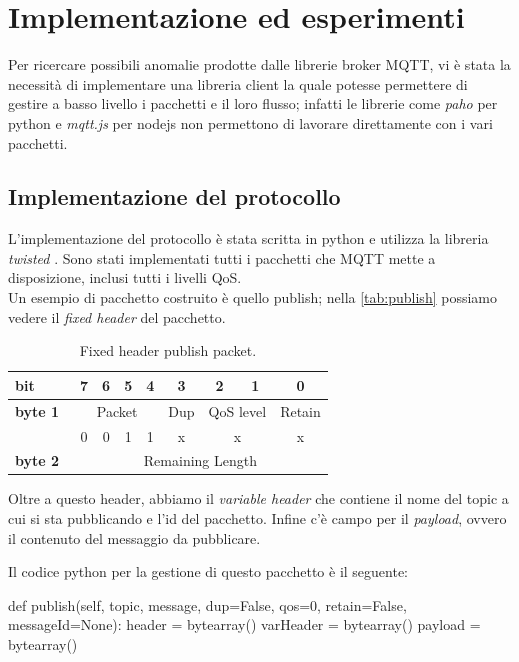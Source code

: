 \documentclass[binding=0.6cm,TFA]{sapthesis}
\begin{document}
\chapter{Implementazione ed esperimenti}
\begin{large}
Per ricercare possibili anomalie prodotte dalle librerie broker MQTT, vi è stata la necessità di implementare una libreria client la quale potesse permettere di gestire a basso livello i pacchetti e il loro flusso; infatti le librerie come \textit{paho} per python e \textit{mqtt.js} per nodejs non permettono di lavorare direttamente con i vari pacchetti.

\section{Implementazione del protocollo}
L'implementazione del protocollo è stata scritta in python e utilizza la libreria \textit{twisted} \cite{wiki:Twisted}. 
Sono stati implementati tutti i pacchetti che MQTT mette a disposizione, inclusi tutti i livelli QoS. \\
Un esempio di pacchetto costruito è quello publish; nella \autoref{tab:publish} possiamo vedere il \textit{fixed header} del pacchetto.

\begin{table}[h]
\caption{Fixed header publish packet.}
\label{tab:publishbytes}
\centering
\begin{tabular}{|l|c|c|c|c|c|c|c|c|}
\hline
\textbf{bit}     & 7 & 6 & 5 & 4 & 3   & 2 & 1 & 0       \\
\hline
\textbf{byte 1}  & \multicolumn{4}{|c|}{Packet} & Dup & \multicolumn{2}{|c|}{QoS level} & Retain  \\
\hline
        & 0 & 0 & 1 & 1 & x   & \multicolumn{2}{|c|}{x} & x \\
\hline
\textbf{byte 2}~ & \multicolumn{8}{|c|}{Remaining Length}                                                       \\
\hline
\end{tabular}
\end{table}

Oltre a questo header, abbiamo il \textit{variable header} che contiene il nome del topic a cui si sta pubblicando e l'id del pacchetto. Infine c'è campo per il \textit{payload}, ovvero il contenuto del messaggio da pubblicare.
\newpage

Il codice python per la gestione di questo pacchetto è il seguente:

\begin{python}
def publish(self, topic, message, dup=False, qos=0, retain=False, messageId=None):
    header = bytearray()
    varHeader = bytearray()
    payload = bytearray()
    

\end{python}
\end{large}
\end{document}

